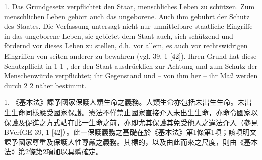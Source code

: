 \documentclass[12pt]{article}
\begin{document}
\begin{sourcepara}[title={原文D.36}]
1. Das Grundgesetz verpflichtet den Staat, menschliches Leben zu schützen. Zum menschlichen Leben gehört auch das ungeborene. Auch ihm gebührt der Schutz des Staates. Die Verfassung untersagt nicht nur unmittelbare staatliche Eingriffe in das ungeborene Leben, sie gebietet dem Staat auch, sich schützend und fördernd vor dieses Leben zu stellen, d.h. vor allem, es auch vor rechtswidrigen Eingriffen von seiten anderer zu bewahren (vgl. \abbrBVerfGE{} 39, 1 [42]). Ihren Grund hat diese Schutzpflicht in \abbrArt{} 1 \abbrAbs{} 1 \abbrGG{}\ggfnArtOneOneDE{}, der den Staat ausdrücklich zur Achtung und zum Schutz der Menschenwürde verpflichtet; ihr Gegenstand und -- von ihm her -- ihr Maß werden durch \abbrArt{} 2 \abbrAbs{} 2 \abbrGG{}\ggfnArtTwoTwoDE{} näher bestimmt.
\end{sourcepara}
\begin{transpara}
1. 《基本法》課予國家保護人類生命之義務。人類生命亦包括未出生生命。未出生生命同樣應受國家保護。憲法不僅禁止國家直接介入未出生生命，亦命令國家以保護及促進之方式站在此一生命之前，亦即尤其保護其免受他人之違法介入（參見 BVerfGE 39, 1 [42]）。此一保護義務之基礎在於《基本法》第1條第1項\ggfnArtOneOneZH{}；該項明文課予國家尊重及保護人性尊嚴之義務。其標的，以及由此而來之尺度，則由《基本法》第2條第2項\ggfnArtTwoTwoZH{}加以具體確定。
\end{transpara}
\end{document}
